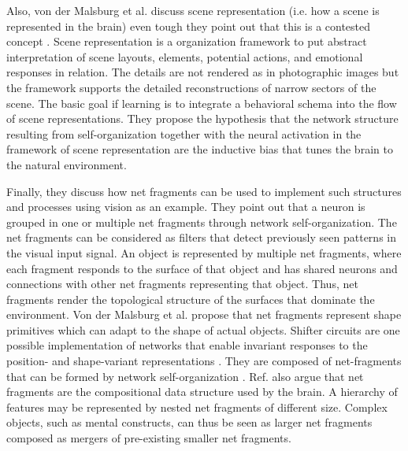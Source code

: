Also, von der Malsburg et al. \cite{von_der_Malsburg_Stadelmann_Grewe_2022} discuss scene representation (i.e. how a scene is represented in the brain) even tough they point out that this is a contested concept .
Scene representation is a organization framework to put abstract interpretation of scene layouts, elements, potential actions, and emotional responses in relation.
The details are not rendered as in photographic images but the framework supports the detailed reconstructions of narrow sectors of the scene.
The basic goal if learning is to integrate a behavioral schema into the flow of scene representations.
They propose the hypothesis that the network structure resulting from self-organization together with the neural activation in the framework of scene representation are the inductive bias that tunes the brain to the natural environment.

Finally, they discuss how net fragments can be used to implement such structures and processes using vision as an example.
They point out that a neuron is grouped in one or multiple net fragments through network self-organization.
The net fragments can be considered as filters that detect previously seen patterns in the visual input signal.
An object is represented by multiple net fragments, where each fragment responds to the surface of that object and has shared neurons and connections with other net fragments representing that object.
Thus, net fragments render the topological structure of the surfaces that dominate the environment.
Von der Malsburg et al. \cite{von_der_Malsburg_Stadelmann_Grewe_2022} propose that net fragments represent shape primitives which can adapt to the shape of actual objects.
Shifter circuits are one possible implementation of networks that enable invariant responses to the position- and shape-variant representations .
They are composed of net-fragments that can be formed by network self-organization .
Ref. \cite{von_der_Malsburg_Stadelmann_Grewe_2022} also argue that net fragments are the compositional data structure used by the brain.
A hierarchy of features may be represented by nested net fragments of different size.
Complex objects, such as mental constructs, can thus be seen as larger net fragments composed as mergers of pre-existing smaller net fragments.


